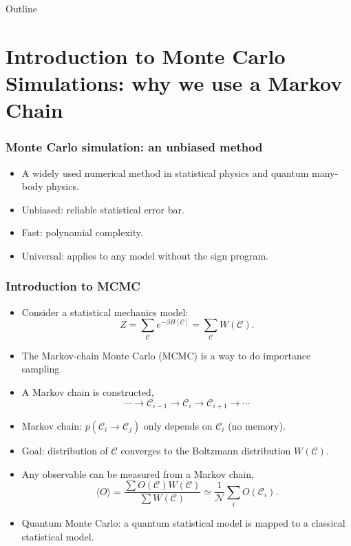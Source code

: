\documentclass[xcolor=table, 10pt, aspectratio=169, ignorenonframetext]{beamer}
\begin{document}
\begin{frame}{Outline}
		\tableofcontents
\end{frame}

\section{Introduction to Monte Carlo Simulations: why we use a Markov Chain}

\begin{frame}
  \frametitle{Monte Carlo simulation: an unbiased method}
  \begin{itemize}
    \item A widely used numerical method in statistical physics and quantum many-body physics.
    \item Unbiased: reliable statistical error bar.
    \item Fast: polynomial complexity.
    \item Universal: applies to any model without the sign program.
  \end{itemize}
\end{frame}

\begin{frame}
  \frametitle{Introduction to MCMC}
  \begin{itemize}
    \item Consider a statistical mechanics model:
    \[Z=\sum_{\mathcal C}e^{-\beta H[\mathcal C]} = \sum_{\mathcal C}W(\mathcal C).\]
    \item The Markov-chain Monte Carlo (MCMC) is a way to do importance sampling.
    \item A Markov chain is constructed,
    \[\cdots\rightarrow\mathcal C_{i-1}\rightarrow\mathcal C_i\rightarrow\mathcal C_{i+1}\rightarrow\cdots\]
    \item Markov chain: $p(\mathcal C_i\rightarrow\mathcal C_j)$ only depends on $\mathcal C_i$ (no memory).
    \item Goal: distribution of $\mathcal C$ converges to the Boltzmann distribution $W(\mathcal C)$.
    \item Any observable can be measured from a Markov chain,
    \[\langle O\rangle = \frac{\sum O(\mathcal C)W(\mathcal C)}{\sum W(\mathcal C)} \simeq
     \frac1{\mathcal N}\sum_iO(\mathcal C_i).\]
    \item Quantum Monte Carlo: a quantum statistical model is mapped to a classical statistical model.
  \end{itemize}
\end{frame}
\end{document}

